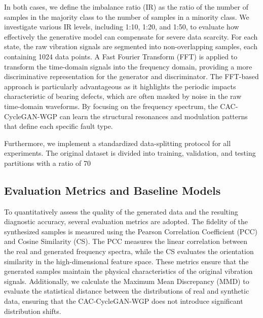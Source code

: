 In both cases, we define the imbalance ratio (IR) as the ratio of the number of samples in the majority class to the number of samples in a minority class. We investigate various IR levels, including 1:10, 1:20, and 1:50, to evaluate how effectively the generative model can compensate for severe data scarcity. For each state, the raw vibration signals are segmented into non-overlapping samples, each containing 1024 data points. A Fast Fourier Transform (FFT) is applied to transform the time-domain signals into the frequency domain, providing a more discriminative representation for the generator and discriminator. The FFT-based approach is particularly advantageous as it highlights the periodic impacts characteristic of bearing defects, which are often masked by noise in the raw time-domain waveforms. By focusing on the frequency spectrum, the CAC-CycleGAN-WGP can learn the structural resonances and modulation patterns that define each specific fault type.

Furthermore, we implement a standardized data-splitting protocol for all experiments. The original dataset is divided into training, validation, and testing partitions with a ratio of 70%

\subsection{Evaluation Metrics and Baseline Models}
To quantitatively assess the quality of the generated data and the resulting diagnostic accuracy, several evaluation metrics are adopted. 
The fidelity of the synthesized samples is measured using the Pearson Correlation Coefficient (PCC) and Cosine Similarity (CS). The PCC measures the linear correlation between the real and generated frequency spectra, while the CS evaluates the orientation similarity in the high-dimensional feature space. These metrics ensure that the generated samples maintain the physical characteristics of the original vibration signals. Additionally, we calculate the Maximum Mean Discrepancy (MMD) to evaluate the statistical distance between the distributions of real and synthetic data, ensuring that the CAC-CycleGAN-WGP does not introduce significant distribution shifts.

